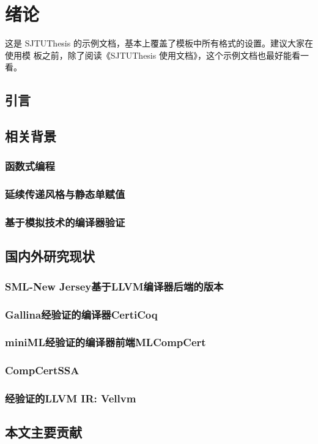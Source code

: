 
\chapter{绪论}

这是 SJTUThesis 的示例文档，基本上覆盖了模板中所有格式的设置。建议大家在使用模
板之前，除了阅读《SJTUThesis 使用文档》，这个示例文档也最好能看一看。

\section{引言}

\section{相关背景}

\subsection{函数式编程}

\subsection{延续传递风格与静态单赋值}

\subsection{基于模拟技术的编译器验证}

\section{国内外研究现状}

\subsection{SML-New Jersey基于LLVM编译器后端的版本}

\subsection{Gallina经验证的编译器CertiCoq}

\subsection{miniML经验证的编译器前端MLCompCert}

\subsection{CompCertSSA}

\subsection{经验证的LLVM IR: Vellvm}

\section{本文主要贡献}


